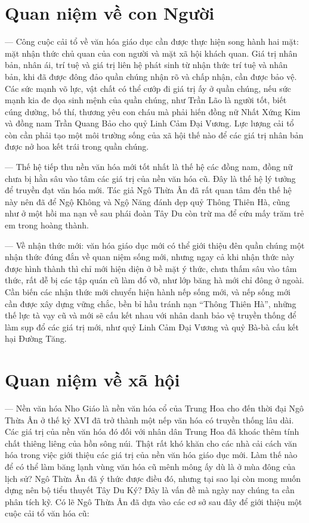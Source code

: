 \section{Quan niệm về con Người} %
\label{sec:47_48_con_nguoi}

— Công cuộc cải tổ về văn hóa giáo dục cần được thực hiện song hành hai mặt: mặt nhận thức chủ quan của con người và mặt xã hội khách quan. Giá trị nhân bản, nhân ái, trí tuệ và giá trị liên hệ phát sinh từ nhận thức trí tuệ và nhân bản, khi đã được đông đảo quần chúng nhận rõ và chấp nhận, cần được bảo vệ. Các sức mạnh võ lực, vật chất có thể cướp đi giá trị ấy ở quần chúng, nếu sức mạnh kia đe dọa sinh mệnh của quần chúng, như Trần Lão là người tốt, biết cúng dường, bố thí, thương yêu con cháu mà phải hiến đồng nữ Nhất Xứng Kim và đồng nam Trần Quang Bảo cho quỷ Linh Cảm Đại Vương. Lực lượng cải tổ còn cần phải tạo một môi trường sống của xã hội thế nào để các giá trị nhân bản được nở hoa kết trái trong quần chúng.

— Thế hệ tiếp thu nền văn hóa mới tốt nhất là thế hệ các đồng nam, đồng nữ chưa bị hằn sâu vào tâm các giá trị của nền văn hóa cũ. Đây là thế hệ lý tưởng để truyền đạt văn hóa mới. Tác giả Ngô Thừa Ân đã rất quan tâm đến thế hệ này nên đã để Ngộ Không và Ngộ Năng đánh dẹp quỷ Thông Thiên Hà, cũng như ở một hồi ma nạn về sau phái đoàn Tây Du còn trừ ma để cứu mấy trăm trẻ em trong hoàng thành.

— Về nhận thức mới: văn hóa giáo dục mới có thể giới thiệu đên quần chúng một nhận thức đúng đắn về quan niệm sống mới, nhưng ngay cả khi nhận thức này được hình thành thì chỉ mới hiện diện ở bề mặt ý thức, chưa thấm sâu vào tâm thức, rất dễ bị các tập quán cũ làm đổ vỡ, như lớp băng hà mới chỉ đông ở ngoài. Cần biến các nhận thức mới chuyển hiện hành nếp sống mới, và nếp sống mới cần được xây dựng vững chắc, bền bỉ hầu tránh nạn ``Thông Thiên Hà'', những thế lực tà vạy cũ và mới sẽ cấu kết nhau với nhân danh bảo vệ truyền thống để làm sụp đổ các giá trị mới, như quỷ Linh Cảm Đại Vương và quỷ Bà-bà cấu kết hại Đường Tăng.

\section{Quan niệm về xã hội} %
\label{sec:47_48_xa_hoi}

— Nền văn hóa Nho Giáo là nền văn hóa cổ của Trung Hoa cho đến thời đại Ngô Thừa Ân ở thế kỷ XVI đã trở thành một nếp văn hóa có truyền thống lâu dài. Các giá trị của nền văn hóa đó đối với nhân dân Trung Hoa đã khoác thêm tính chất thiêng liêng của hồn sông núi. Thật rất khó khăn cho các nhà cải cách văn hóa trong việc giới thiệu các giá trị của nền văn hóa giáo dục mới. Làm thế nào để có thể làm băng lạnh vùng văn hóa cũ mênh mông ấy dù là ở mùa đông của lịch sử? Ngô Thừa Ân đã ý thức được điều đó, nhưng tại sao lại còn mong muốn dựng nên bộ tiểu thuyết Tây Du Ký? Đây là vấn đề mà ngày nay chúng ta cần phân tích kỹ. Có lẽ Ngô Thừa Ân đã dựa vào các cơ sở sau đây để giới thiệu một cuộc cải tổ văn hóa cũ:

